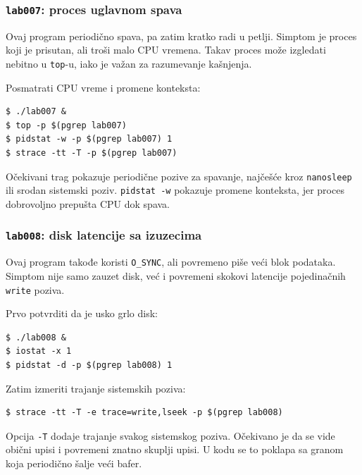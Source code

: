 \subsubsection{\texorpdfstring{\texttt{lab007}: proces uglavnom spava}{lab007: proces uglavnom spava}}\label{lab007-proces-spava}

Ovaj program periodično spava, pa zatim kratko radi u petlji. Simptom je proces koji je prisutan, ali troši malo CPU vremena. Takav proces može izgledati nebitno u \texttt{top}-u, iako je važan za razumevanje kašnjenja.


Posmatrati CPU vreme i promene konteksta:

\begin{verbatim}
$ ./lab007 &
$ top -p $(pgrep lab007)
$ pidstat -w -p $(pgrep lab007) 1
$ strace -tt -T -p $(pgrep lab007)
\end{verbatim}

Očekivani trag pokazuje periodične pozive za spavanje, najčešće kroz \texttt{nanosleep} ili srodan sistemski poziv. \texttt{pidstat -w} pokazuje promene konteksta, jer proces dobrovoljno prepušta CPU dok spava.

\subsubsection{\texorpdfstring{\texttt{lab008}: disk latencije sa izuzecima}{lab008: disk latencije sa izuzecima}}\label{lab008-disk-latencije}

Ovaj program takođe koristi \texttt{O\_SYNC}, ali povremeno piše veći blok podataka. Simptom nije samo zauzet disk, već i povremeni skokovi latencije pojedinačnih \texttt{write} poziva.


Prvo potvrditi da je usko grlo disk:

\begin{verbatim}
$ ./lab008 &
$ iostat -x 1
$ pidstat -d -p $(pgrep lab008) 1
\end{verbatim}

Zatim izmeriti trajanje sistemskih poziva:

\begin{verbatim}
$ strace -tt -T -e trace=write,lseek -p $(pgrep lab008)
\end{verbatim}

Opcija \texttt{-T} dodaje trajanje svakog sistemskog poziva. Očekivano je da se vide obični upisi i povremeni znatno skuplji upisi. U kodu se to poklapa sa granom koja periodično šalje veći bafer.

